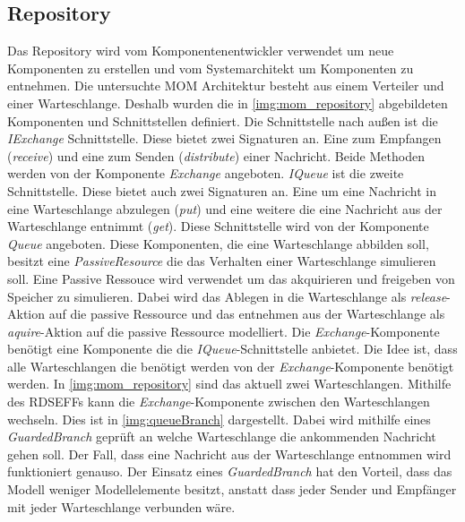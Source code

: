 \subsection{Repository}
Das Repository wird vom Komponentenentwickler verwendet um neue Komponenten zu erstellen und vom Systemarchitekt um Komponenten zu entnehmen. Die untersuchte MOM Architektur besteht aus einem Verteiler und einer Warteschlange. Deshalb wurden die in \autoref{img:mom_repository} abgebildeten Komponenten und Schnittstellen definiert. Die Schnittstelle nach außen ist die \emph{IExchange} Schnittstelle. Diese bietet zwei Signaturen an. Eine zum Empfangen (\emph{receive}) und eine zum Senden (\emph{distribute}) einer Nachricht. Beide Methoden werden von der Komponente \emph{Exchange} angeboten. \emph{IQueue} ist die zweite Schnittstelle. Diese bietet auch zwei Signaturen an. Eine um eine Nachricht in eine Warteschlange abzulegen (\emph{put}) und eine weitere die eine Nachricht aus der Warteschlange entnimmt (\emph{get}). Diese Schnittstelle wird von der Komponente \emph{Queue} angeboten. Diese Komponenten, die eine Warteschlange abbilden soll, besitzt eine \emph{PassiveResource} die das Verhalten einer Warteschlange simulieren soll. Eine Passive Ressouce wird verwendet um das akquirieren und freigeben von Speicher zu simulieren. Dabei wird das Ablegen in die Warteschlange als \emph{release}-Aktion auf die passive Ressource und das entnehmen aus der Warteschlange als \emph{aquire}-Aktion auf die passive Ressource modelliert. Die \emph{Exchange}-Komponente benötigt eine Komponente die die \emph{IQueue}-Schnittstelle anbietet. Die Idee ist, dass alle Warteschlangen die benötigt werden von der \emph{Exchange}-Komponente benötigt werden. In \autoref{img:mom_repository} sind das aktuell zwei Warteschlangen. Mithilfe des RDSEFFs kann die \emph{Exchange}-Komponente zwischen den Warteschlangen wechseln. Dies ist in \autoref{img:queueBranch} dargestellt. Dabei wird mithilfe eines \emph{GuardedBranch} geprüft an welche Warteschlange die ankommenden Nachricht gehen soll. Der Fall, dass eine Nachricht aus der Warteschlange entnommen wird funktioniert genauso. Der Einsatz eines \emph{GuardedBranch} hat den Vorteil, dass das Modell weniger Modellelemente besitzt, anstatt dass jeder Sender und Empfänger mit jeder Warteschlange verbunden wäre.




